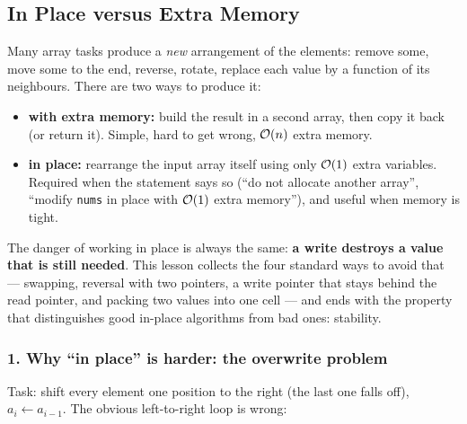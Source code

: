 \subsection{In Place versus Extra Memory}
\label{ssec:ch1-inplace}

Many array tasks produce a \emph{new} arrangement of the elements: remove some, move some to the end, reverse, rotate, replace each value by a function of its neighbours. There are two ways to produce it:
\begin{itemize}[leftmargin=*]
    \item \textbf{with extra memory:} build the result in a second array, then copy it back (or return it). Simple, hard to get wrong, $\mathcal{O}(n)$ extra memory.
    \item \textbf{in place:} rearrange the input array itself using only $\mathcal{O}(1)$ extra variables. Required when the statement says so (``do not allocate another array'', ``modify \texttt{nums} in place with $\mathcal{O}(1)$ extra memory''), and useful when memory is tight.
\end{itemize}
The danger of working in place is always the same: \textbf{a write destroys a value that is still needed}. This lesson collects the four standard ways to avoid that --- swapping, reversal with two pointers, a write pointer that stays behind the read pointer, and packing two values into one cell --- and ends with the property that distinguishes good in-place algorithms from bad ones: stability.

\subsubsection*{1. Why ``in place'' is harder: the overwrite problem}

Task: shift every element one position to the right (the last one falls off), $a_i \gets a_{i-1}$. The obvious left-to-right loop is wrong:

